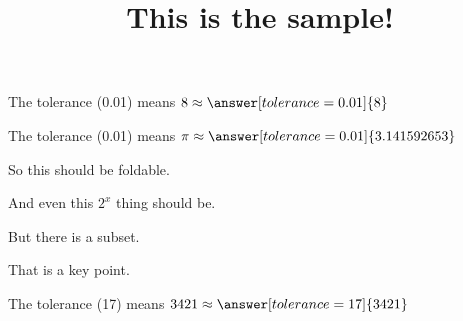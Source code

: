 \documentclass{ximera}
\title{This is the sample!}
\begin{document}
\maketitle


 \begin{problem}
   The tolerance (0.01) means $8 \approx \answer[tolerance=0.01]{8}$
 \end{problem}

 \begin{problem}
   The tolerance (0.01) means $\pi \approx \answer[tolerance=0.01]{3.141592653}$
 \end{problem}


\begin{foldable}
  So this should be foldable.

  And even this $2^x$ thing should be.
  
  \begin{foldable}
  But there is a subset.  
  \end{foldable}

    That is a key point.  

 \begin{problem}
   The tolerance (17) means $3421 \approx \answer[tolerance=17]{3421}$
 \end{problem}

\end{foldable}




  
    
\end{document}
